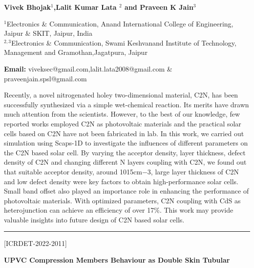 \documentclass[twoside,11pt]{amsart}
\begin{document}
\centerline{\textbf{Vivek Bhojak$^{1}$,Lalit Kumar Lata
$^{2}$ and Praveen K Jain$^{3}$  }}
\vskip 5mm
\begin{flushleft}
$^{1}$Electronics \& Communication, Anand International College of Engineering, Jaipur \& SKIT, Jaipur, India\\
$^{2,3}$Electronics \& Communication, Swami Keshvanand Institute of Technology, Management and Gramothan,Jagatpura, Jaipur\\
\vskip 5mm
\end{flushleft}
\vskip 2mm
\begin{flushleft}
{\bf Email:} viveksec@gmail.com,lalit.lata2008@gmail.com \& praveenjain.spsl@gmail.com
\end{flushleft}
\vskip 5mm
Recently, a novel nitrogenated holey two-dimensional material, C2N, has been successfully synthesized via a simple wet-chemical reaction. Its merits have drawn much attention from the scientists.
\vskip 2mm
\newpage
 However, to the best of our knowledge, few reported works employed C2N as photovoltaic materials and the practical solar cells based on C2N have not been fabricated in lab. In this work, we carried out simulation using Scaps-1D to investigate the influences of different parameters on the C2N based solar cell. By varying the acceptor density, layer thickness, defect density of C2N and changing different N layers coupling with C2N, we found out that suitable acceptor density, around 1015cm−3, large layer thickness of C2N and low defect density were key factors to obtain high-performance solar cells. Small band offset also played an importance role in enhancing the performance of photovoltaic materials. With optimized parameters, C2N coupling with CdS as heterojunction can achieve an efficiency of over 17\%. This work may provide valuable insights into future design of C2N based solar cells.
\vskip 2mm
\rule{\textwidth}{0.5pt}

\vskip 5mm
\begin{flushleft}
\centerline{[ICRDET-2022-2011]}
\end{flushleft}
\begin{center}\bf\LARGE
UPVC Compression Members Behaviour as Double Skin Tubular
\end{center}
\vskip 5mm
\end{document}
